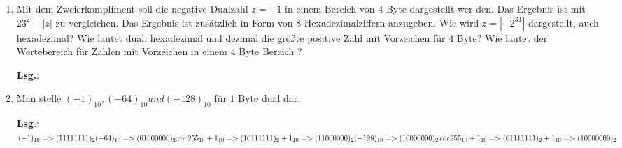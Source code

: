 \documentclass[12pt,a4paper]{scrreprt}
\newcommand{\Lsg}{\par \textbf{Lsg.: \hfill }}
\begin{document}
\begin{enumerate}
Die folgenden Zahlen sind mit dem Hornerschema in Dezimalzahlen zu konvertieren:

\begin{enumerate}
	\item $(0,375)_8$
	\item $(0,1210)_{10}$
	\item $(0,888)_9$
	\item $(0,ADDA)_{16}$
\end{enumerate}

\Lsg%

\item Mit dem Zweierkompliment soll die negative Dualzahl $z =-1$ in einem Bereich von $4$ Byte dargestellt wer den. Das Ergebnis ist mit $23^2-|z|$ zu vergleichen. Das Ergebnis ist zusätzlich in Form von $8$ Hexadezimalziffern anzugeben. Wie wird $z=|-2^31|$ dargestellt, auch hexadezimal?
Wie lautet dual, hexadezimal und dezimal die größte positive Zahl mit Vorzeichen für $4$ Byte? Wie lautet der Wertebereich für Zahlen mit Vorzeichen in einem $4$ Byte Bereich ?

\Lsg%

\item Man stelle $(-1)_{10}, (-64)_{10} und (-128)_{10}$ für $1$ Byte dual dar. \\

\Lsg\begin{math}
      (-1)_{10} => (11111111)_2 \\
     (-64)_{10} => (01000000)_2 xor 255_{10} + 1_{10} \\ => (10111111)_2 + 1_{10} => (11000000)_2 \\
    (-128)_{10} => (10000000)_2 xor 255_{10} + 1_{10} \\ => (01111111)_2 + 1_{10} => (10000000)_2 
\end{math}

\end{enumerate}
\end{document}
